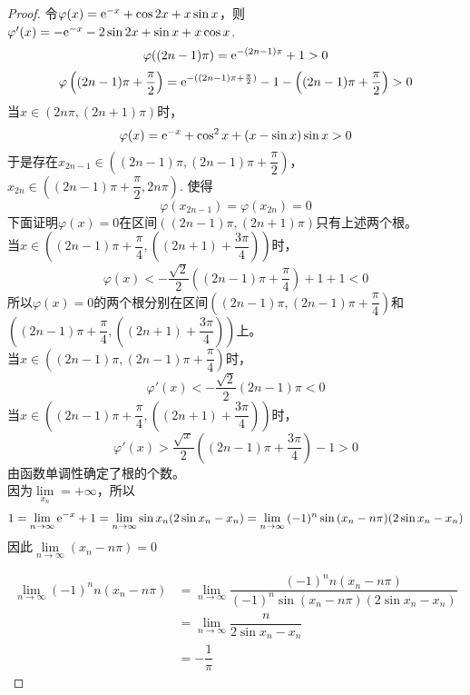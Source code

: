 \begin{proof}

    令$\varphi(x) = \mathrm{e}^{-x} + \cos{2x} + x\sin{x}$，则$\varphi'(x) = -\mathrm{e}^{-x} - 2\sin{2x} + \sin{x} + x\cos{x}$. 
    $$\varphi((2n -1)\pi) = \mathrm{e}^{-(2n -1)\pi} + 1 > 0$$
    $$\varphi\left( (2n -1)\pi + \dfrac{\pi}{2}\right) = \mathrm{e}^{-((2n - 1)\pi + \frac{\pi}{2})} - 1 - \left((2n - 1)\pi + \dfrac{\pi}{2}\right) > 0$$
    当$x \in (2n\pi, (2n + 1)\pi)$时，
    $$\varphi(x) = \mathrm{e}^{-x} + \cos^2{x} + (x - \sin{x})\sin{x} > 0$$
    于是存在$x_{2n - 1} \in \left((2n - 1)\pi, (2n -1)\pi + \dfrac{\pi}{2}\right)$，$x_{2n} \in \left((2n - 1)\pi + \dfrac{\pi}{2}, 2n\pi\right)$. 使得
    $$\varphi(x_{2n - 1}) = \varphi(x_{2n}) = 0$$
    下面证明$\varphi(x) = 0$在区间$((2n -1)\pi, (2n + 1)\pi)$只有上述两个根。\\
    当$x \in \left((2n -1)\pi + \dfrac{\pi}{4}, ((2n + 1) + \dfrac{3\pi}{4})\right)$时，
    $$\varphi(x) < -\dfrac{\sqrt{2}}{2}\left((2n - 1)\pi + \dfrac{\pi}{4}\right) + 1 + 1 < 0$$
    所以$\varphi(x) = 0$的两个根分别在区间$\left((2n - 1)\pi, (2n - 1)\pi + \dfrac{\pi}{4}\right)$和 \\
    $\left((2n -1)\pi + \dfrac{\pi}{4}, ((2n + 1) + \dfrac{3\pi}{4})\right)$上。 \\
    当$x \in \left((2n - 1)\pi, (2n - 1)\pi + \dfrac{\pi}{4}\right)$时，
    $$\varphi'(x) < -\dfrac{\sqrt{2}}{2}(2n - 1)\pi < 0$$ 
    当$x \in \left((2n -1)\pi + \dfrac{\pi}{4}, ((2n + 1) + \dfrac{3\pi}{4})\right)$时，
    $$\varphi'(x) > \dfrac{\sqrt{x}}{2} \left((2n -1)\pi + \dfrac{3\pi}{4}\right) - 1 > 0$$
    由函数单调性确定了根的个数。\\
    因为$\lim\limits_{x_n} = + \infty$，所以
    $$1 = \lim\limits_{n \to \infty}{\mathrm{e}^{-x} + 1} = \lim\limits_{n \to \infty}{\sin{x_n}(2\sin{x_n} - x_n)} = \lim\limits_{n \to \infty}{(-1)^n \sin{(x_n - n\pi)}(2\sin{x_n} - x_n)}$$
    因此$\lim\limits_{n \to \infty}{(x_n - n\pi)} = 0$
    
    \begin{align*}
        \lim\limits_{n \to \infty}{(-1)^n n(x_n - n\pi)} & = \lim\limits_{n \to \infty}{\dfrac{(-1)^n n (x_n - n\pi)}{(-1)^n \sin{(x_n - n\pi)}(2\sin{x_n} - x_n)}} \\
        & = \lim\limits_{n \to \infty}{\dfrac{n}{2\sin{x_n} - x_n}} \\
        & = -\dfrac{1}{\pi}
    \end{align*}

\end{proof}

